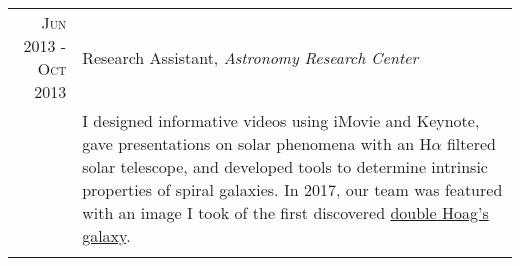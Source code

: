 \documentclass[a4paper,10pt]{article} %
\begin{document}
\begin{tabular}{r|p{11cm}}
\textsc{Jun 2013 - Oct 2013} & Research Assistant, \emph{Astronomy Research Center}\\
& \footnotesize{I designed informative videos using iMovie and Keynote, gave presentations on solar phenomena with an H$\alpha$ filtered solar telescope, and developed tools to determine intrinsic properties of spiral galaxies. In 2017, our team was featured with an image I took of the first discovered \href{http://www.wired.co.uk/article/new-hoag-type-galaxy-discovered}{double Hoag's galaxy}.}\\
\multicolumn{2}{c}{} 




\end{tabular}
\end{document}

